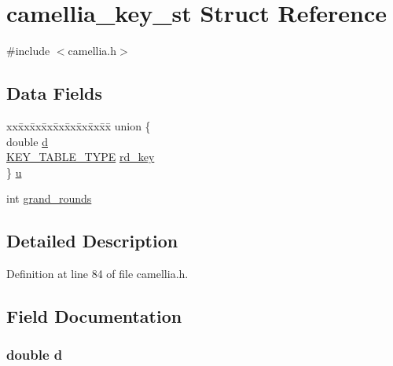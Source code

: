 \hypertarget{structcamellia__key__st}{}\section{camellia\+\_\+key\+\_\+st Struct Reference}
\label{structcamellia__key__st}


{\ttfamily \#include $<$camellia.\+h$>$}

\subsection*{Data Fields}
\begin{DoxyCompactItemize}
\item 
\begin{tabbing}
xx\=xx\=xx\=xx\=xx\=xx\=xx\=xx\=xx\=\kill
union \{\\
\>double \hyperlink{structcamellia__key__st_a873684cefeb665f3d5e6b495de57fc0d}{d}\\
\>\hyperlink{camellia_8h_a7fdfdeb07c85db8ec9c0edd180888805}{KEY\_TABLE\_TYPE} \hyperlink{structcamellia__key__st_a7316710cc313afa3ef128d486e238461}{rd\_key}\\
\} \hyperlink{structcamellia__key__st_aac87cdaf20e59977c21432ee2143728d}{u}\\

\end{tabbing}\item 
int \hyperlink{structcamellia__key__st_ab274b84127748d8091aec9f36392c17d}{grand\+\_\+rounds}
\end{DoxyCompactItemize}


\subsection{Detailed Description}


Definition at line 84 of file camellia.\+h.



\subsection{Field Documentation}
\subsubsection[{\texorpdfstring{d}{d}}]{\setlength{\rightskip}{0pt plus 5cm}double d}\hypertarget{structcamellia__key__st_a873684cefeb665f3d5e6b495de57fc0d}{}\label{structcamellia__key__st_a873684cefeb665f3d5e6b495de57fc0d}


